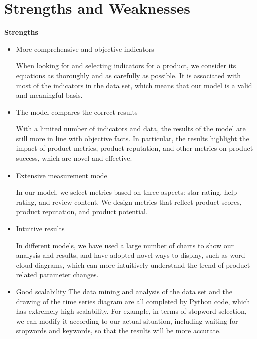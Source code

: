 \documentclass{mcmthesis}
\begin{document}
\section{Strengths and Weaknesses}

\textbf{Strengths}
	\begin{itemize}
		\item More comprehensive and objective indicators
		
			When looking for and selecting indicators for a product, we consider its equations as thoroughly and as carefully as possible. It is associated with most of the indicators in the data set, which means that our model is a valid and meaningful basis.
		
		\item The model compares the correct results
		
		With a limited number of indicators and data, the results of the model are still more in line with objective facts. In particular, the results highlight the impact of product metrics, product reputation, and other metrics on product success, which are novel and effective.
		
		\item Extensive measurement mode
		
		In our model, we select metrics based on three aspects: star rating, help rating, and review content. We design metrics that reflect product scores, product reputation, and product potential.
		
		\item Intuitive results
		
			In different models, we have used a large number of charts to show our analysis and results, and have adopted novel ways to display, such as word cloud diagrams, which can more intuitively understand the trend of product-related parameter changes.
		
		\item Good scalability
			The data mining and analysis of the data set and the drawing of the time series diagram are all completed by Python code, which has extremely high scalability. For example, in terms of stopword selection, we can modify it according to our actual situation, including waiting for stopwords and keywords, so that the results will be more accurate.
		
	\end{itemize}
	
\end{document}
